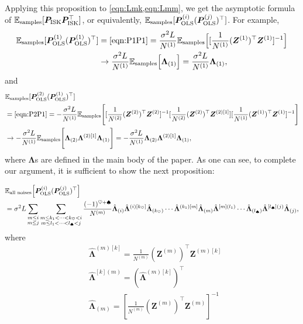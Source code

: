 \documentclass{article}
\begin{document}
Applying this proposition to \cref{eqn:Lmk,eqn:Lmm}, we get the asymptotic formula of $
\mathbb{E}_\text{samples}[
\bm P_\text{ISK} \bm P_\text{ISK}^\top]$, or equivalently, $\mathbb{E}_\text{samples}[\bm P_\mathrm{OLS}^{(i)} (\bm P_\mathrm{OLS}^{(j)})^\top]$.
For example,
\begin{align}
\E_\text{samples}[\bm P_\mathrm{OLS}^{(1)} (\bm P_\mathrm{OLS}^{(1)})^\top]
&=
\cref{eqn:P1P1}
=
\frac{\sigma^2 L}{N^{(1)}} \E_\text{samples}
\Big[
[\frac{1}{N^{(1)}} (\bm Z^{(1)})^\top \bm Z^{(1)} ]^{-1}
\Big]
\notag \\
& \to
\frac{\sigma^2 L}{N^{(1)}} \E_\text{samples}
\Big[
\bm \Lambda_{(1)}
\Big]
=
\frac{\sigma^2 L}{N^{(1)}} \bm \Lambda_{(1)},
\end{align}
and
\begin{align}
&\E_\text{samples}[\bm P_\mathrm{OLS}^{(2)} (\bm P_\mathrm{OLS}^{(1)})^\top]
\notag \\
&=
\cref{eqn:P2P1}
=
- \frac{\sigma^2 L}{N^{(1)}}
\E_\text{samples}
\Bigg[
[\frac{1}{N^{(2)}} ({\bm Z}^{(2)})^\top {\bm Z}^{(2)}]^{-1}
[\frac{1}{N^{(2)}}({\bm Z}^{(2)})^\top \bm Z^{(2)[1]}]
[\frac{1}{N^{(1)}}({\bm Z}^{(1)})^\top {\bm Z}^{(1)}]^{-1}
\Bigg]
\notag \\
& \to
- \frac{\sigma^2 L}{N^{(1)}}
\E_\text{samples}
\Bigg[
\bm \Lambda_{(2)}
\bm \Lambda^{(2)[1]}
\bm \Lambda_{(1)}
\Bigg]
=
- \frac{\sigma^2 L}{N^{(1)}}
\bm \Lambda_{(2)}
\bm \Lambda^{(2)[1]}
\bm \Lambda_{(1)},
\end{align}
where $\bm \Lambda$s are defined in the main body of the paper.
As one can see, to complete our argument, it is sufficient to show the next proposition:
\begin{prop}
\begin{align}
&\mathbb{E}_\text{all noises}
\Big[
\bm P^{(i)}_\mathrm{OLS}
(\bm P^{(j)}_\mathrm{OLS})^\top
\Big]
\notag \\
&=
\sigma^2 L
\sum_{
\substack{
m \leq i
\\
m \leq j
}}
\sum_{
\substack{
m\leq k_1<\cdots<k_{\heartsuit}< i
\\
m \leq l_1<\cdots<l_{\spadesuit}<j
}
}
\frac{(-1)^{\heartsuit + \spadesuit}}{N^{(m)}}
\hat{\bm \Lambda}_{(i)}
\hat{\bm \Lambda}^{(i)[k_{\heartsuit}]}
\hat{\bm \Lambda}_{(k_{\heartsuit} )}
\cdots
\hat{\bm \Lambda}^{(k_1)[m]}
\hat{\bm \Lambda}_{(m)}
\hat{\bm \Lambda}^{[m](l_1)}
\cdots
\hat{\bm \Lambda}_{(l_{\spadesuit} )}
\hat{\bm \Lambda}^{[l_{\spadesuit}](j)}
\hat{\bm \Lambda}_{(j)},
\label{eqn:31}
\end{align}
where
\begin{align}
&\hat{\bm \Lambda}^{(m)[k]}
=
\frac{1}{N^{(m)}}
({\bm Z}^{(m)})^\top 
{\bm Z}^{(m)[k]}
\\
&
\hat{\bm \Lambda}^{[k](m)}
=
(\hat{\bm \Lambda}^{(m)[k]})^\top
\\
&
\hat{\bm \Lambda}_{(m)}
=
[\frac{1}{N^{(m)}}({\bm Z}^{(m)})^\top 
{\bm Z}^{(m)}]^{-1}
\end{align}
\end{prop}
\end{document}
